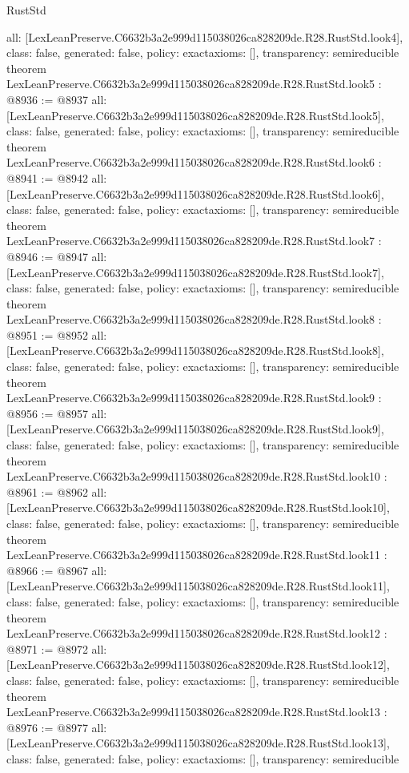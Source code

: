 \begin{lexlean}{RustStd}
\begin{coremodule}
{  all: [LexLeanPreserve.C6632b3a2e999d115038026ca828209de.R28.RustStd.look4],
  class: false,
  generated: false,
  policy: exact{axioms: []},
  transparency: semireducible
}
theorem LexLeanPreserve.C6632b3a2e999d115038026ca828209de.R28.RustStd.look5 : @8936 := @8937 {
  all: [LexLeanPreserve.C6632b3a2e999d115038026ca828209de.R28.RustStd.look5],
  class: false,
  generated: false,
  policy: exact{axioms: []},
  transparency: semireducible
}
theorem LexLeanPreserve.C6632b3a2e999d115038026ca828209de.R28.RustStd.look6 : @8941 := @8942 {
  all: [LexLeanPreserve.C6632b3a2e999d115038026ca828209de.R28.RustStd.look6],
  class: false,
  generated: false,
  policy: exact{axioms: []},
  transparency: semireducible
}
theorem LexLeanPreserve.C6632b3a2e999d115038026ca828209de.R28.RustStd.look7 : @8946 := @8947 {
  all: [LexLeanPreserve.C6632b3a2e999d115038026ca828209de.R28.RustStd.look7],
  class: false,
  generated: false,
  policy: exact{axioms: []},
  transparency: semireducible
}
theorem LexLeanPreserve.C6632b3a2e999d115038026ca828209de.R28.RustStd.look8 : @8951 := @8952 {
  all: [LexLeanPreserve.C6632b3a2e999d115038026ca828209de.R28.RustStd.look8],
  class: false,
  generated: false,
  policy: exact{axioms: []},
  transparency: semireducible
}
theorem LexLeanPreserve.C6632b3a2e999d115038026ca828209de.R28.RustStd.look9 : @8956 := @8957 {
  all: [LexLeanPreserve.C6632b3a2e999d115038026ca828209de.R28.RustStd.look9],
  class: false,
  generated: false,
  policy: exact{axioms: []},
  transparency: semireducible
}
theorem LexLeanPreserve.C6632b3a2e999d115038026ca828209de.R28.RustStd.look10 : @8961 := @8962 {
  all: [LexLeanPreserve.C6632b3a2e999d115038026ca828209de.R28.RustStd.look10],
  class: false,
  generated: false,
  policy: exact{axioms: []},
  transparency: semireducible
}
theorem LexLeanPreserve.C6632b3a2e999d115038026ca828209de.R28.RustStd.look11 : @8966 := @8967 {
  all: [LexLeanPreserve.C6632b3a2e999d115038026ca828209de.R28.RustStd.look11],
  class: false,
  generated: false,
  policy: exact{axioms: []},
  transparency: semireducible
}
theorem LexLeanPreserve.C6632b3a2e999d115038026ca828209de.R28.RustStd.look12 : @8971 := @8972 {
  all: [LexLeanPreserve.C6632b3a2e999d115038026ca828209de.R28.RustStd.look12],
  class: false,
  generated: false,
  policy: exact{axioms: []},
  transparency: semireducible
}
theorem LexLeanPreserve.C6632b3a2e999d115038026ca828209de.R28.RustStd.look13 : @8976 := @8977 {
  all: [LexLeanPreserve.C6632b3a2e999d115038026ca828209de.R28.RustStd.look13],
  class: false,
  generated: false,
  policy: exact{axioms: []},
  transparency: semireducible
}
\end{coremodule}
\end{lexlean}
